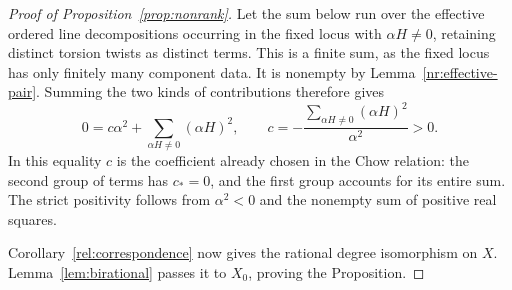 \begin{proof}[Proof of Proposition~\ref{prop:nonrank}]
Let the sum below run over the effective ordered line decompositions
occurring in the fixed locus with $\alpha H\ne0$, retaining distinct
torsion twists as distinct terms.  This is a finite sum, as the fixed
locus has only finitely many component data.  It is nonempty by
Lemma~\ref{nr:effective-pair}.  Summing the two kinds of contributions
therefore gives
\begin{equation}\label{nr:positive-coefficient}
 0=c\alpha^2+\sum_{\alpha H\ne0}(\alpha H)^2,
 \qquad
 c=-\frac{\displaystyle\sum_{\alpha H\ne0}(\alpha H)^2}{\alpha^2}>0.
\end{equation}
In this equality $c$ is the coefficient already chosen in the Chow
relation: the second group of terms has $c_*=0$, and the first group
accounts for its entire sum.  The strict positivity follows from
$\alpha^2<0$ and the nonempty sum of positive real squares.

Corollary~\ref{rel:correspondence} now gives
the rational degree isomorphism on $X$.  Lemma~\ref{lem:birational}
passes it to $X_0$, proving the Proposition.
\end{proof}
